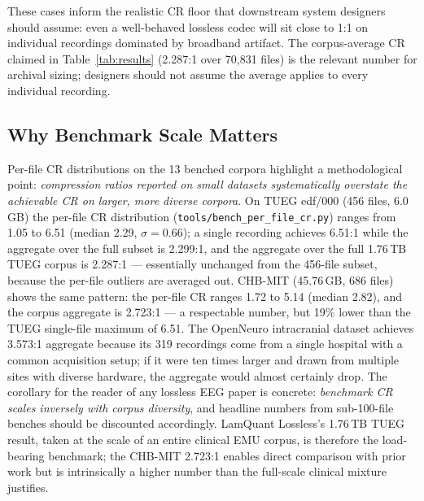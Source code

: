 \documentclass[journal]{IEEEtran}
\begin{document}
These cases inform the realistic CR floor that downstream system
designers should assume: even a well-behaved lossless codec will
sit close to 1:1 on individual recordings dominated by
broadband artifact. The corpus-average CR claimed in
Table~\ref{tab:results} (2.287:1 over 70{,}831 files) is the
relevant number for archival sizing; designers should not assume
the average applies to every individual recording.

\subsection{Why Benchmark Scale Matters}
\label{sec:scale}
Per-file CR distributions on the 13 benched corpora highlight a
methodological point: \emph{compression ratios reported on small
datasets systematically overstate the achievable CR on larger,
more diverse corpora}. On TUEG edf/000 (456 files,
6.0\,GB) the per-file CR distribution
(\texttt{tools/bench\_per\_file\_cr.py}) ranges from 1.05 to
6.51 (median 2.29, $\sigma = 0.66$); a single recording achieves
6.51:1 while the aggregate over the full subset is 2.299:1, and the
aggregate over the full 1.76\,TB TUEG corpus is 2.287:1 ---
essentially unchanged from the 456-file subset, because the
per-file outliers are averaged out. CHB-MIT (45.76\,GB, 686 files)
shows the same pattern: the per-file CR ranges 1.72 to 5.14
(median 2.82), and the corpus aggregate is 2.723:1 --- a respectable
number, but 19\% lower than the TUEG single-file maximum of 6.51.
The OpenNeuro intracranial dataset achieves 3.573:1 aggregate
because its 319 recordings come from a single hospital with a
common acquisition setup; if it were ten times larger and drawn
from multiple sites with diverse hardware, the aggregate would
almost certainly drop. The corollary for the reader of any
lossless EEG paper is concrete: \emph{benchmark CR scales inversely
with corpus diversity}, and headline numbers from sub-100-file
benches should be discounted accordingly. LamQuant Lossless's
1.76\,TB TUEG result, taken at the scale of an entire clinical EMU
corpus, is therefore the load-bearing benchmark; the CHB-MIT
2.723:1 enables direct comparison with prior work but is intrinsically
a higher number than the full-scale clinical mixture justifies.
\end{document}
